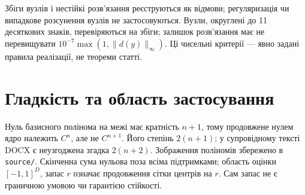 \documentclass[11pt,a4paper]{article}
\begin{document}
Збіги вузлів і нестійкі розв'язання реєструються як відмови;
регуляризація чи випадкове розсунення вузлів не застосовуються.
Вузли, округлені до 11 десяткових знаків, перевіряються на збіги;
залишок розв'язання має не перевищувати $10^{-7}\max(1,\|d(y)\|_\infty)$.
Ці чисельні критерії --- явно задані правила реалізації, не теореми статті.

\section*{Гладкість та область застосування}
Нуль базисного полінома на межі має кратність $n+1$, тому продовжене
нулем ядро належить $C^n$, але не $C^{n+1}$. Його степінь $2(n+1)$;
у супровідному тексті DOCX є неузгоджена згадка $2(n+2)$.
Зображення поліномів збережено в \texttt{source/}.
Скінченна сума нульова поза всіма підтримками; область оцінки
$[-1,1]^D$, запас $r$ означає продовження сітки центрів на $r$.
Сам запас не є граничною умовою чи гарантією стійкості.
\end{document}
